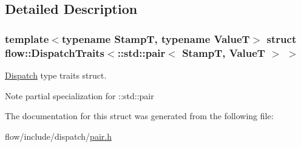\subsection{Detailed Description}
\subsubsection*{template$<$typename StampT, typename ValueT$>$\newline
struct flow\+::\+Dispatch\+Traits$<$\+::std\+::pair$<$ Stamp\+T, Value\+T $>$ $>$}

\hyperlink{classflow_1_1_dispatch}{Dispatch} type traits struct. 

\begin{DoxyNote}{Note}
partial specialization for {\ttfamily \+::std\+::pair} 
\end{DoxyNote}


The documentation for this struct was generated from the following file\+:\begin{DoxyCompactItemize}
\item 
flow/include/dispatch/\hyperlink{pair_8h}{pair.\+h}\end{DoxyCompactItemize}
